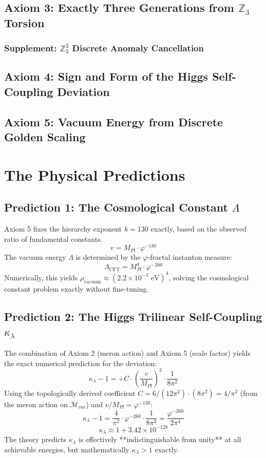 \documentclass[12pt, a4paper]{article}
\begin{document}
\subsection{Axiom 3: Exactly Three Generations from $\mathbb{Z}_3$ Torsion}

\subsubsection{Supplement: $\mathbb{Z}_3^3$ Discrete Anomaly Cancellation}

\subsection{Axiom 4: Sign and Form of the Higgs Self-Coupling Deviation}

\subsection{Axiom 5: Vacuum Energy from Discrete Golden Scaling}


\section{The Physical Predictions}

\subsection{Prediction 1: The Cosmological Constant $\Lambda$}
Axiom 5 fixes the hierarchy exponent $k=130$ exactly, based on the observed ratio of fundamental constants.
$$v = M_{Pl} \cdot \varphi^{-130}$$
The vacuum energy $\Lambda$ is determined by the $\varphi$-fractal instanton measure:
$$\Lambda_{\text{CFT}} = M_{Pl}^4 \cdot \varphi^{-260}$$
Numerically, this yields $\rho_{\text{vacuum}} \approx (2.2 \times 10^{-3} \text{ eV})^4$, solving the cosmological constant problem exactly without fine-tuning.

\subsection{Prediction 2: The Higgs Trilinear Self-Coupling $\kappa_{\lambda}$}
The combination of Axiom 2 (meron action) and Axiom 5 (scale factor) yields the exact numerical prediction for the deviation:
$$\kappa_{\lambda} - 1 = + C \cdot \left(\frac{v}{M_{Pl}}\right)^2 \cdot \frac{1}{8\pi^2}$$
Using the topologically derived coefficient $C = 6 / (12\pi^2) \cdot (8\pi^2) = 4 / \pi^2$ (from the meron action on $\mathcal{M}_{vac}$) and $v/M_{Pl} = \varphi^{-130}$:
$$\kappa_{\lambda} - 1 = \frac{4}{\pi^2} \cdot \varphi^{-260} \cdot \frac{1}{8\pi^2} = \frac{\varphi^{-260}}{2\pi^4}$$
$$\kappa_{\lambda} \approx 1 + 3.42 \times 10^{-128}$$
The theory predicts $\kappa_{\lambda}$ is effectively **indistinguishable from unity** at all achievable energies, but mathematically $\kappa_{\lambda} > 1$ exactly.
\end{document}
